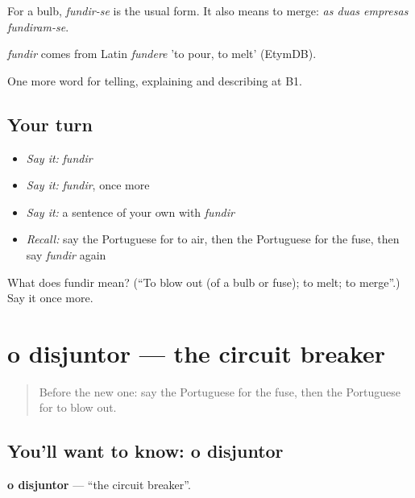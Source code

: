 For a bulb, \emph{fundir-se} is the usual form. It also means to merge: \emph{as duas empresas fundiram-se}.

\begin{cousinweb}
\emph{fundir} comes from Latin \emph{fundere} 'to pour, to melt' (EtymDB).
\end{cousinweb}

\begin{grammarlens}[title={What you've built}]
One more word for telling, explaining and describing at B1.
\end{grammarlens}

\subsection*{Your turn}
\begin{itemize}
\raggedright
  \item \emph{Say it:} \emph{fundir}
  \item \emph{Say it:} \emph{fundir}, once more
  \item \emph{Say it:} a sentence of your own with \emph{fundir}
  \item \emph{Recall:} say the Portuguese for to air, then the Portuguese for the fuse, then say \emph{fundir} again
\end{itemize}

\begin{tcolorbox}[breakable,colback=teal!4,colframe=teal!35!black,title={Before you move on}]
What does fundir mean? (\textquotedblleft{}To blow out (of a bulb or fuse); to melt; to merge\textquotedblright{}.) Say it once more.
\end{tcolorbox}
\section[o disjuntor]{o disjuntor — the circuit breaker}

\label{lesson:PT-C432-disjuntor}



\begin{quote}
Before the new one: say the Portuguese for the fuse, then the Portuguese for to blow out.
\end{quote}

\subsection*{You'll want to know: o disjuntor}
\textbf{o disjuntor} — \textquotedblleft{}the circuit breaker\textquotedblright{}.

